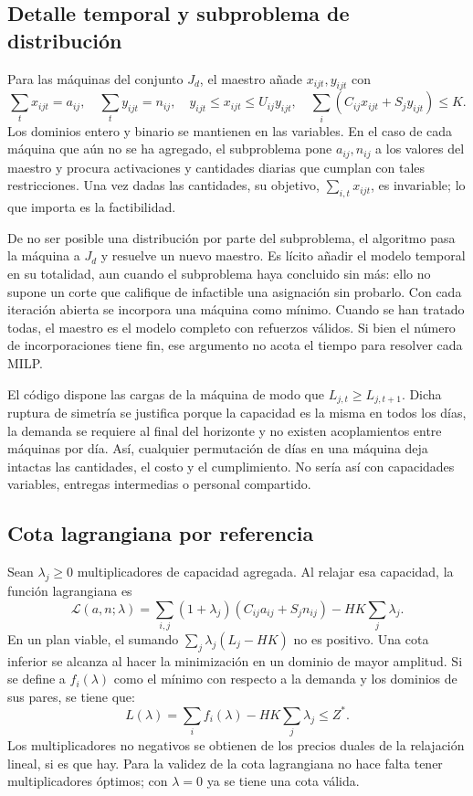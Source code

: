 \subsection{Detalle temporal y subproblema de distribución}
Para las máquinas del conjunto $J_d$, el maestro añade $x_{ijt},y_{ijt}$ con
\[
\sum_t x_{ijt}=a_{ij},\quad \sum_t y_{ijt}=n_{ij},\quad
 y_{ijt}\leq x_{ijt}\leq U_{ij}y_{ijt},\quad
\sum_i(C_{ij}x_{ijt}+S_jy_{ijt})\leq K.
\]
Los dominios entero y binario se mantienen en las variables. En el caso de cada máquina que aún no se ha agregado, el subproblema pone $a_{ij},n_{ij}$ a los valores del maestro y procura activaciones y cantidades diarias que cumplan con tales restricciones. Una vez dadas las cantidades, su objetivo, $\sum_{i,t}x_{ijt}$, es invariable; lo que importa es la factibilidad.

De no ser posible una distribución por parte del subproblema, el algoritmo pasa la máquina a $J_d$ y resuelve un nuevo maestro. Es lícito añadir el modelo temporal en su totalidad, aun cuando el subproblema haya concluido sin más: ello no supone un corte que califique de infactible una asignación sin probarlo. Con cada iteración abierta se incorpora una máquina como mínimo. Cuando se han tratado todas, el maestro es el modelo completo con refuerzos válidos. Si bien el número de incorporaciones tiene fin, ese argumento no acota el tiempo para resolver cada MILP.

El código dispone las cargas de la máquina de modo que $L_{j,t}\geq L_{j,t+1}$. Dicha ruptura de simetría se justifica porque la capacidad es la misma en todos los días, la demanda se requiere al final del horizonte y no existen acoplamientos entre máquinas por día. Así, cualquier permutación de días en una máquina deja intactas las cantidades, el costo y el cumplimiento. No sería así con capacidades variables, entregas intermedias o personal compartido.

\subsection{Cota lagrangiana por referencia}
Sean $\lambda_j\geq0$ multiplicadores de capacidad agregada. Al relajar esa capacidad, la función lagrangiana es
\[
\mathcal L(a,n;\lambda)=\sum_{i,j}(1+\lambda_j)(C_{ij}a_{ij}+S_jn_{ij})-HK\sum_j\lambda_j.
\]
En un plan viable, el sumando $\sum_j\lambda_j(L_j-HK)$ no es positivo. Una cota inferior se alcanza al hacer la minimización en un dominio de mayor amplitud. Si se define a $f_i(\lambda)$ como el mínimo con respecto a la demanda y los dominios de sus pares, se tiene que:
\[
L(\lambda)=\sum_i f_i(\lambda)-HK\sum_j\lambda_j\leq Z^*.
\]
Los multiplicadores no negativos se obtienen de los precios duales de la relajación lineal, si es que hay. Para la validez de la cota lagrangiana no hace falta tener multiplicadores óptimos; con $\lambda=0$ ya se tiene una cota válida.

